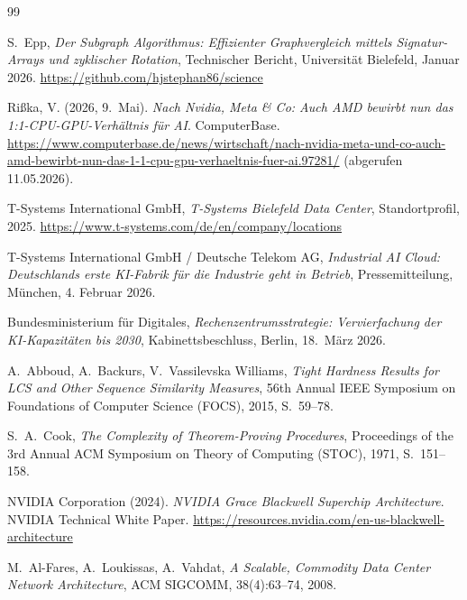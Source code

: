 ﻿\documentclass[a4paper,12pt]{article}
\theoremstyle{definition}
\begin{document}
\begin{thebibliography}{99}

  S.~Epp,
  \emph{Der Subgraph Algorithmus: Effizienter Graphvergleich mittels Signatur-Arrays und zyklischer Rotation},
  Technischer Bericht, Universit\"{a}t Bielefeld, Januar 2026.
  \url{https://github.com/hjstephan86/science}

  Ri{\ss}ka, V. (2026, 9.~Mai).
  \emph{Nach Nvidia, Meta \& Co: Auch AMD bewirbt nun das 1:1-CPU-GPU-Verh\"{a}ltnis f\"{u}r AI}.
  ComputerBase.
  \url{https://www.computerbase.de/news/wirtschaft/nach-nvidia-meta-und-co-auch-amd-bewirbt-nun-das-1-1-cpu-gpu-verhaeltnis-fuer-ai.97281/}
  (abgerufen 11.05.2026).

  T-Systems International GmbH,
  \emph{T-Systems Bielefeld Data Center},
  Standortprofil, 2025.
  \url{https://www.t-systems.com/de/en/company/locations}

  T-Systems International GmbH / Deutsche Telekom AG,
  \emph{Industrial AI Cloud: Deutschlands erste KI-Fabrik f\"{u}r die Industrie geht in Betrieb},
  Pressemitteilung, M\"{u}nchen, 4. Februar 2026.

  Bundesministerium f\"{u}r Digitales,
  \emph{Rechenzentrumsstrategie: Vervierfachung der KI-Kapazit\"{a}ten bis 2030},
  Kabinettsbeschluss, Berlin, 18.~M\"{a}rz 2026.

  A.~Abboud, A.~Backurs, V.~Vassilevska Williams,
  \emph{Tight Hardness Results for LCS and Other Sequence Similarity Measures},
  56th Annual IEEE Symposium on Foundations of Computer Science (FOCS), 2015, S.~59--78.

  S.~A.~Cook,
  \emph{The Complexity of Theorem-Proving Procedures},
  Proceedings of the 3rd Annual ACM Symposium on Theory of Computing (STOC), 1971, S.~151--158.

  NVIDIA Corporation (2024).
  \emph{NVIDIA Grace Blackwell Superchip Architecture}.
  NVIDIA Technical White Paper.
  \url{https://resources.nvidia.com/en-us-blackwell-architecture}

  M.~Al-Fares, A.~Loukissas, A.~Vahdat,
  \emph{A Scalable, Commodity Data Center Network Architecture},
  ACM SIGCOMM, 38(4):63--74, 2008.


\end{thebibliography}
\end{document}
